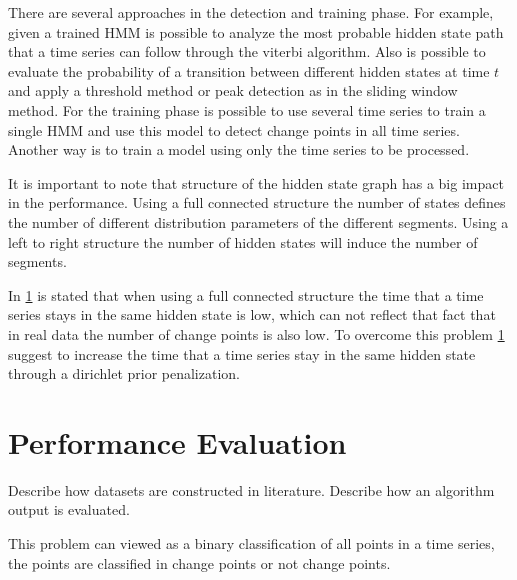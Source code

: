There are several approaches in the detection and training phase. For example, given a trained HMM is possible to analyze the most probable hidden state path that a time series can follow through the viterbi algorithm. Also is possible to evaluate the probability of a transition between different hidden states at time $t$ and apply a threshold method or peak detection as in the sliding window method. For the training phase is possible to use several time series to train a single HMM and use this model to detect change points in all time series. Another way is to train a model using only the time series to be processed.

It is important to note that structure of the hidden state graph has a big impact in the performance. Using a full connected structure the number of states defines the number of different distribution parameters of the different segments. Using a left to right structure the number of hidden states will induce the number of segments.

In \ref{} is stated that when using a full connected structure the time that a time series stays in the same hidden state is low, which can not reflect that fact that in real data the number of change points is also low. To overcome this problem \ref{} suggest to increase the time that a time series stay in the same hidden state through a dirichlet prior penalization.


\section{Performance Evaluation}
  Describe how datasets are constructed in literature. Describe how an algorithm output is evaluated.

This problem can viewed as a binary classification of all points in a time series, the points are classified in change points or not change points.

